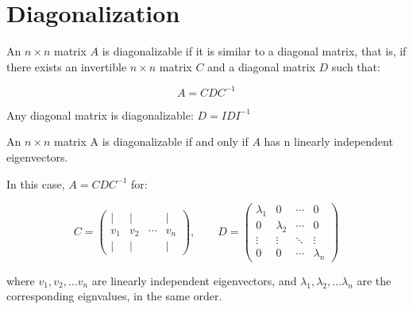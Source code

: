 % 


\section{Diagonalization}

\begin{definition}[diagonalization]
   An $n  \times n$ matrix $A$ is diagonalizable if it is similar to a diagonal matrix, that is, if there exists an invertible $n \times n$ matrix $C$ and a diagonal matrix $D$ such that:

   $$A = C D C^{-1}$$
\end{definition}

\begin{eg}
    Any diagonal matrix is diagonalizable:  $D = IDI^{-1}$    
\end{eg}

\begin{theorem}\label{theorem: diagonal theorem}
    An $n \times n$ matrix A is diagonalizable if and only if $A$ has n linearly independent eigenvectors.

    In this case, $A = CDC^{-1}$ for:

    \[
    C = \begin{pmatrix}
        | & | &  & | \\
        v_1 & v_2 & \cdots & v_n \\
        | & | &  & | 
        \end{pmatrix},
        \qquad
    D = \begin{pmatrix}
        \lambda_1 & 0 & \cdots & 0  \\  
        0 & \lambda_2 & \cdots & 0 \\
        \vdots & \vdots & \ddots & \vdots \\
        0 & 0 & \cdots & \lambda_n 
    \end{pmatrix} 
    \]

    where $v_1, v_2, \dots v_n$  are linearly independent eigenvectors, and $\lambda_1, \lambda_2, \dots \lambda_n$ are the corresponding eignvalues, in the same order.
\end{theorem}

